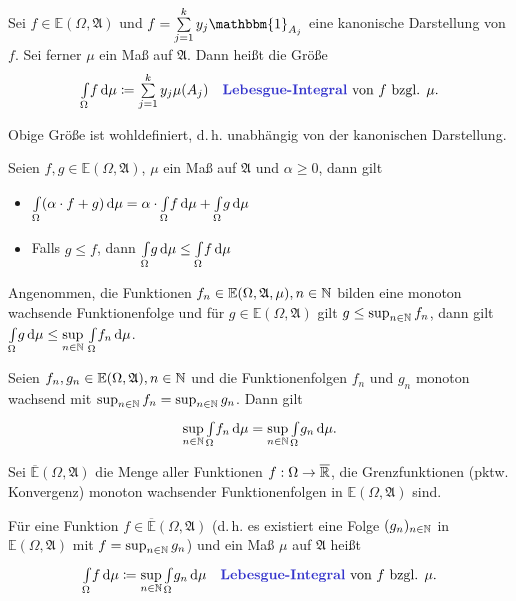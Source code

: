 \documentclass{cheat-sheet}
\newcommand{\Alg}{\mathfrak{A}} %
\newcommand{\E}{\mathbb{E}} %
\newcommand{\ind}{\mathbbm{1}} %
\theoremstyle{definition}
\newcommand{\IntOmu}[1]{\Int{\Omega}{}{#1}{\mu}} %
\begin{document}
\begin{defn}
  Sei $f \in \E(\Omega, \Alg)$ und $\textstyle f = \sum_{j=1}^k y_j \ind_{A_j}$ eine kanonische Darstellung von $f$. Sei ferner $\mu$ ein Maß auf $\Alg$. Dann heißt die Größe
  \[ \IntOmu{f} \coloneqq \sum_{j=1}^k y_j \mu(A_j) \quad \text{\emph{Lebesgue-Integral} von $f$ bzgl. $\mu$.} \]
\end{defn}

\begin{bem}
  Obige Größe ist wohldefiniert, d.\,h. unabhängig von der kanonischen Darstellung.
\end{bem}

\begin{satz}
  Seien $f, g \in \E(\Omega, \Alg)$, $\mu$ ein Maß auf $\Alg$ und $\alpha \geq 0$, dann gilt
  \begin{itemize}
    \item $\IntOmu{(\alpha \cdot f + g)} = \alpha \cdot \IntOmu{f} + \IntOmu{g}$ 
    \item Falls $g \leq f$, dann $\IntOmu{g} \leq \IntOmu{f}$ 
  \end{itemize}
\end{satz}

\begin{satz}
  Angenommen, die Funktionen $f_n \in \E(\Omega, \Alg, \mu), n \in \N$ bilden eine monoton wachsende Funktionenfolge und für $g \in \E(\Omega, \Alg)$ gilt $g \leq \sup_{n \in \mathbb{N}} f_n$, dann gilt $\textstyle \IntOmu{g} \leq \sup\limits_{n \in \N} \, \IntOmu{f_n}$.
\end{satz}

\begin{kor}
  Seien $f_n, g_n \in \E(\Omega, \Alg), n \in \N$ und die Funktionenfolgen $f_n$ und $g_n$ monoton wachsend mit $\sup_{n \in \mathbb{N}} f_n = \sup_{n \in \mathbb{N}} g_n$. Dann gilt
  \[ \sup_{n \in \N} \IntOmu{f_n} = \sup_{n \in \N} \IntOmu{g_n}. \]
\end{kor}

\begin{defn}
  Sei $\overline{\E}(\Omega, \Alg)$ die Menge aller Funktionen $f : \Omega \to \overline{\mathbb{R}}$, die Grenzfunktionen (pktw. Konvergenz) monoton wachsender Funktionenfolgen in $\E(\Omega, \Alg)$ sind.
\end{defn}

\begin{defn}
  Für eine Funktion $f \in \overline{\E}(\Omega, \Alg)$ (d.\,h. es existiert eine Folge $(g_n)_{n \in \mathbb{N}}$ in $\E(\Omega, \Alg)$ mit $f = \sup_{n \in \mathbb{N}} g_n$) und ein Maß $\mu$ auf $\Alg$ heißt
  \[ \IntOmu{f} \coloneqq \sup_{n \in \N} \IntOmu{g_n} \quad \text{\emph{Lebesgue-Integral} von $f$ bzgl. $\mu$.} \]
\end{defn}
\end{document}
